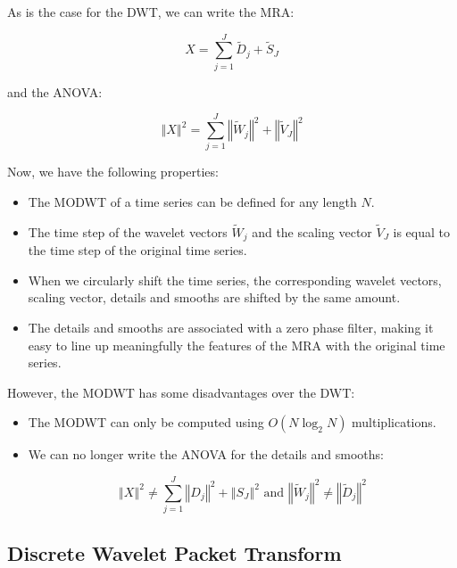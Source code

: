 \documentclass[main.tex]{subfiles}
\begin{document}
As is the case for the DWT, we can write the MRA:

\begin{equation}
X = \sum_{j = 1}^{J} \widetilde{D}_j + \widetilde{S}_J
\end{equation}

and the ANOVA:

\begin{equation}
\left\Vert X \right\Vert ^2 = \sum_{j = 1}^{J} \left\Vert \widetilde{W}_j \right\Vert ^2 + \left\Vert \widetilde{V}_J \right\Vert ^2
\end{equation}

Now, we have the following properties:

\begin{itemize}
	\item The MODWT of a time series can be defined for any length $N$.
	\item The time step of the wavelet vectors $\widetilde{W}_j$ and the scaling vector $\widetilde{V}_J$ is equal to the time step of the original time series.
	\item When we circularly shift the time series, the corresponding wavelet vectors, scaling vector, details and smooths are shifted by the same amount.
	\item The details and smooths are associated with a zero phase filter, making it easy to line up meaningfully the features of the MRA with the original time series.
\end{itemize}

However, the MODWT has some disadvantages over the DWT:

\begin{itemize}
	\item The MODWT can only be computed using $O \left( N \log_2 N \right)$ multiplications.
	\item We can no longer write the ANOVA for the details and smooths:

\begin{equation}
\left\Vert X \right\Vert ^2 \neq \sum_{j = 1}^{J} \left\Vert D_j \right\Vert ^2 + \left\Vert S_J \right\Vert ^2 \text{ and } \left\Vert \widetilde{W}_j \right\Vert ^2 \neq \left\Vert \widetilde{D}_j \right\Vert ^2
\end{equation}

\end{itemize}

\subsection{Discrete Wavelet Packet Transform}
\end{document}
